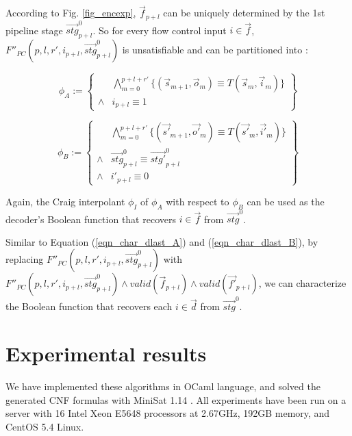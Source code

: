 \documentclass[conference]{IEEEtran}
\begin{document}
According to Fig. \ref{fig_encexp},
$\vec{f}_{p+l}$ can be uniquely determined by the 1st pipeline stage $\vec{stg}^0_{p+l}$.
So for every flow control input $i\in\vec{f}$,
$F''_{PC}(p,l,r',i_{p+l},\vec{stg}^0_{p+l})$ is unsatisfiable and can be partitioned into :

\begin{equation}
\phi_A:=
\left\{
\begin{array}{cc}
&\bigwedge_{m=0}^{p+l+r'}
\{
(\vec{s}_{m+1},\vec{o}_m)\equiv T(\vec{s}_m,\vec{i}_m)
\}
\\
\wedge& i_{p+l}\equiv 1 
\end{array}
\right\}
\end{equation}

\begin{equation}
\phi_B:=
\left\{
\begin{array}{cc}
&\bigwedge_{m=0}^{p+l+r'}
\{
(\vec{s'}_{m+1},\vec{o'}_m)\equiv T(\vec{s'}_m,\vec{i'}_m)
\}
\\
\wedge&\vec{stg}^0_{p+l}\equiv \vec{stg'}^0_{p+l} \\
\wedge& i'_{p+l}\equiv 0 
\end{array}
\right\}
\end{equation}

Again,
the Craig interpolant $\phi_I$ of $\phi_A$ with respect to $\phi_B$ 
can be used as the decoder's Boolean function that recovers $i\in\vec{f}$ from $\vec{stg}^0$.

Similar to Equation (\ref{eqn_char_dlast_A}) and (\ref{eqn_char_dlast_B}),
by replacing $F''_{PC}(p,l,r',i_{p+l},\vec{stg}^0_{p+l})$ with $F''_{PC}(p,l,r',i_{p+l},\vec{stg}^0_{p+l})\wedge valid(\vec{f}_{p+l})\wedge valid(\vec{f'}_{p+l})$,
we can characterize the Boolean function that recovers each $i\in\vec{d}$ from $\vec{stg}^0$.



\section{Experimental results}\label{sec_exp}
We have implemented these algorithms in OCaml language,
and solved the generated CNF formulas with MiniSat 1.14 \cite{EXTSAT}.
All experiments have been run on a server with 16 Intel Xeon E5648 processors at 2.67GHz, 
192GB memory, and CentOS 5.4 Linux.
\end{document}
